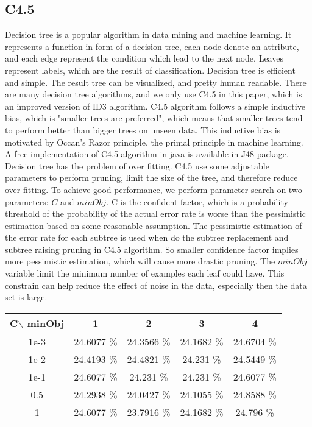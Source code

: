 \documentclass[a4paper,11pt]{article}
\begin{document}
\subsection{C4.5}
Decision tree is a popular algorithm in data mining and machine learning. It represents a function in form of a decision tree, each node denote an attribute, and each edge represent the condition which lead to the next node. Leaves represent labels, which are the result of classification. Decision tree is efficient and simple. The result tree can be visualized, and pretty human readable. There are many decision tree algorithms, and we only use C4.5 in this paper, which is an improved version of ID3 algorithm. C4.5 algorithm follows a simple inductive bias, which is "smaller trees are preferred", which means that smaller trees tend to perform better than bigger trees on unseen data. This inductive bias is motivated by Occan's Razor principle, the primal principle in machine learning. A free implementation of C4.5 algorithm in java is available in J48 package.\\
Decision tree has the problem of over fitting. C4.5 use some adjustable parameters to perform pruning, limit the size of the tree, and therefore reduce over fitting. To achieve good performance, we perform parameter search on two parameters: $C$ and $minObj$. C is the confident factor, which is a probability threshold of the probability of the actual error rate is worse than the pessimistic estimation based on some reasonable assumption. The pessimistic estimation of the error rate for each subtree is used when do the subtree replacement and subtree raising pruning in C4.5 algorithm. So smaller confidence factor implies more pessimistic estimation, which will cause more drastic pruning. The $minObj$ variable limit the minimum number of examples each leaf could have. This constrain can help reduce the effect of noise in the data, especially then the data set is large.
\vspace{0.5cm}\\
\begin{tabular}{c|c c c c}
C$\backslash$ minObj	&1		&2		&3		&4\\
\hline \hline 
1e-3 	&24.6077 \%	&24.3566 \%	&24.1682 \%	 &24.6704 \%\\
1e-2	&24.4193 \%	 &24.4821 \%	&24.231  \%	 &24.5449 \%\\
1e-1	&24.6077 \%	&24.231  \%	&24.231  \%	 &24.6077 \%\\
0.5 &24.2938 \%     &24.0427 \% &24.1055 \%  &24.8588 \%\\
1	&24.6077 \%	&23.7916 \%	&24.1682 \%	 &24.796  \%\\
\end{tabular}
\end{document}
